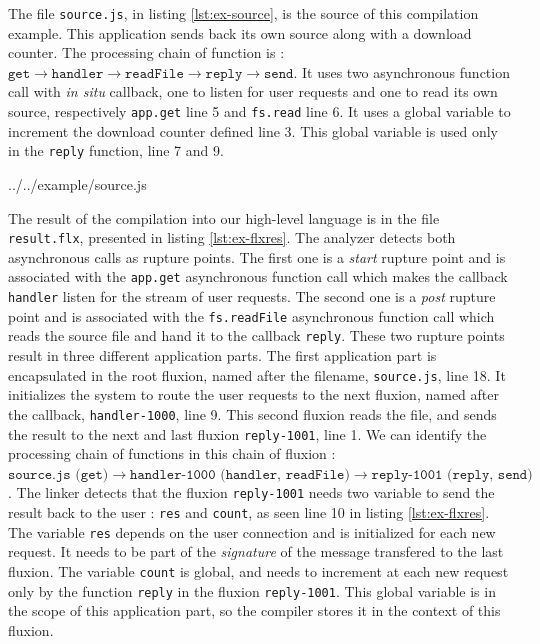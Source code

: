 The file \texttt{source.js}, in listing \ref{lst:ex-source}, is the source of this compilation example.
This application sends back its own source along with a download counter.
The processing chain of function is : $\texttt{get} \to \texttt{handler} \to \texttt{readFile} \to \texttt{reply} \to \texttt{send}$.
It uses two asynchronous function call with \textit{in situ} callback, one to listen for user requests and one to read its own source, respectively \texttt{app.get} line 5 and \texttt{fs.read} line 6.
It uses a global variable to increment the download counter defined line 3.
This global variable is used only in the \texttt{reply} function, line 7 and 9.

{../../example/source.js}

The result of the compilation into our high-level language is in the file \texttt{result.flx}, presented in listing \ref{lst:ex-flxres}.
The analyzer detects both asynchronous calls as rupture points.
The first one is a \textit{start} rupture point and is associated with the \texttt{app.get} asynchronous function call which makes the callback \texttt{handler} listen for the stream of user requests. 
The second one is a \textit{post} rupture point and is associated with the \texttt{fs.readFile} asynchronous function call which reads the source file and hand it to the callback \texttt{reply}.
These two rupture points result in three different application parts.
The first application part is encapsulated in the root fluxion, named after the filename, \texttt{source.js}, line 18.
It initializes the system to route the user requests to the next fluxion, named after the callback, \texttt{handler-1000}, line 9.
This second fluxion reads the file, and sends the result to the next and last fluxion \texttt{reply-1001}, line 1.
We can identify the processing chain of functions in this chain of fluxion : $\texttt{source.js (get)} \to \texttt{handler-1000 (handler, readFile)} \to \texttt{reply-1001 (reply, send)}$.
The linker detects that the fluxion \texttt{reply-1001} needs two variable to send the result back to the user : \texttt{res} and \texttt{count}, as seen line 10 in listing \ref{lst:ex-flxres}.
The variable \texttt{res} depends on the user connection and is initialized for each new request.
It needs to be part of the \textit{signature} of the message transfered to the last fluxion.
The variable \texttt{count} is global, and needs to increment at each new request only by the function \texttt{reply} in the fluxion \texttt{reply-1001}.
This global variable is in the scope of this application part, so the compiler stores it in the context of this fluxion.

